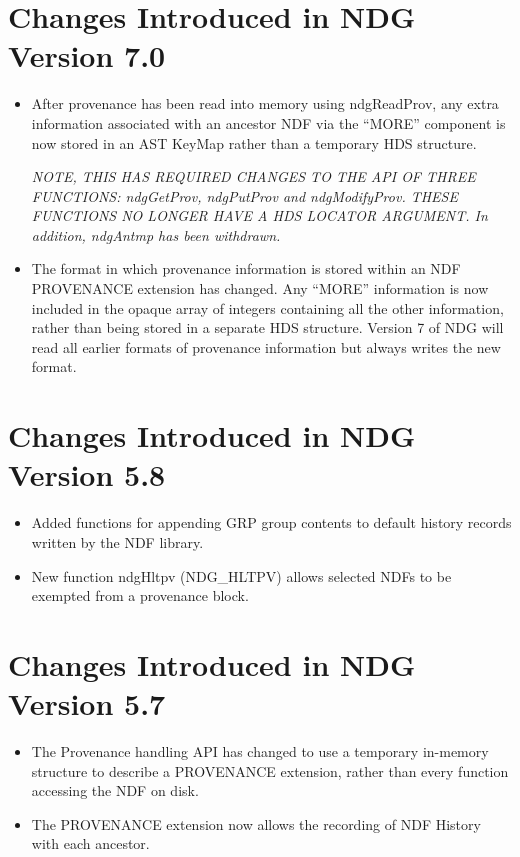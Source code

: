 \documentclass[twoside,11pt,nolof]{starlink}
\begin{document}
\section{Changes Introduced in NDG Version 7.0}
\begin{itemize}
   \item After provenance has been read into memory using ndgReadProv,
   any extra information associated with an ancestor NDF via the ``MORE''
   component is now stored in an AST KeyMap rather than a temporary HDS
   structure.

   \emph{NOTE, THIS HAS REQUIRED CHANGES TO THE API OF THREE FUNCTIONS:
   ndgGetProv, ndgPutProv and ndgModifyProv. THESE FUNCTIONS NO LONGER
   HAVE A HDS LOCATOR ARGUMENT. In addition, ndgAntmp has been withdrawn.}

   \item The format in which provenance information is stored within an
   NDF PROVENANCE extension has changed. Any ``MORE'' information is now
   included in the opaque array of integers containing all the other
   information, rather than being stored in a separate HDS structure.
   Version 7 of NDG will read all earlier formats of provenance
   information but always writes the new format.
\end{itemize}

\section{Changes Introduced in NDG Version 5.8}
\begin{itemize}
   \item Added functions for appending GRP group contents to default
    history records written by the NDF library.
   \item New function ndgHltpv (NDG\_HLTPV) allows selected NDFs to be
    exempted from a provenance block.
\end{itemize}

\section{Changes Introduced in NDG Version 5.7}
\begin{itemize}
   \item The Provenance handling API has changed to use a temporary
    in-memory structure to describe a PROVENANCE extension, rather than
    every function accessing the NDF on disk.
   \item The PROVENANCE extension now allows the recording of NDF History
    with each ancestor.
\end{itemize}
\end{document}
